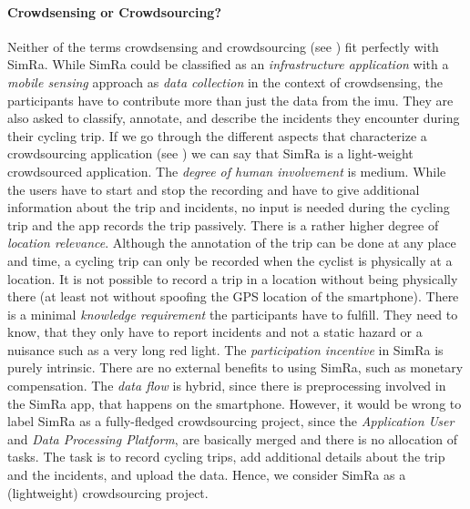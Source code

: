 \paragraph{Crowdsensing or Crowdsourcing?}
Neither of the terms crowdsensing and crowdsourcing (see ) fit perfectly with SimRa.
While SimRa could be classified as an \textit{infrastructure application} with a \textit{mobile sensing} approach as \textit{data collection} in the context of crowdsensing, the participants have to contribute more than just the data from the \ac{imu}.
They are also asked to classify, annotate, and describe the incidents they encounter during their cycling trip.
If we go through the different aspects that characterize a crowdsourcing application (see ) we can say that SimRa is a light-weight crowdsourced application.
The \textit{degree of human involvement} is medium.
While the users have to start and stop the recording and have to give additional information about the trip and incidents, no input is needed during the cycling trip and the app records the trip passively.
There is a rather higher degree of \textit{location relevance}.
Although the annotation of the trip can be done at any place and time, a cycling trip can only be recorded when the cyclist is physically at a location.
It is not possible to record a trip in a location without being physically there (at least not without spoofing the GPS location of the smartphone).
There is a minimal \textit{knowledge requirement} the participants have to fulfill.
They need to know, that they only have to report incidents and not a static hazard or a nuisance such as a very long red light.
The \textit{participation incentive} in SimRa is purely intrinsic.
There are no external benefits to using SimRa, such as monetary compensation.
The \textit{data flow} is hybrid, since there is preprocessing involved in the SimRa app, that happens on the smartphone.
However, it would be wrong to label SimRa as a fully-fledged crowdsourcing project, since the \textit{Application User} and \textit{Data Processing Platform}, are basically merged and there is no allocation of tasks.
The task is to record cycling trips, add additional details about the trip and the incidents, and upload the data.
Hence, we consider SimRa as a (lightweight) crowdsourcing project.


